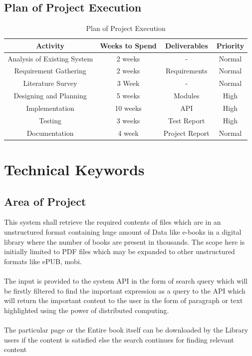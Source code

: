 \documentclass[oneside,a4paper,12pt]{report}
\begin{document}
\section{Plan of Project Execution}
\begin{table}[!htbp]
\begin{center}
\def\arraystretch{1.5}
  \begin{tabular}{| c | c | c | c |}
       \hline

	\textbf{Activity} & \textbf{Weeks to Spend} & \textbf{Deliverables} & \textbf{Priority}\\ \hline
	Analysis of Existing System & 2 weeks & - & Normal \\ \hline
	Requirement Gathering & 2 weeks & Requirements & Normal \\ \hline 
	Literature Survey & 3 Week & - & Normal \\ \hline
	Designing and Planning & 5 weeks & Modules & High \\ \hline
	Implementation & 10 weeks & API & High \\ \hline
	Testing & 3 weeks & Test Report & High \\ \hline
	Documentation & 4 week & Project Report & Normal \\ \hline
\end{tabular}
 \caption { Plan of Project Execution }
 \label{tab:hreq}
\end{center}

\end{table}



\chapter{Technical Keywords}
\section{Area of Project}
This  system  shall  retrieve  the  required  contents  of  files  which  are  in  an  unstructured  format containing huge amount of Data like e-books in a digital library where the number of books are present in thousands. The scope here is initially limited to PDF files which may be expanded to other unstructured formats like ePUB, mobi. \\ \\
The input is provided to the system API in the form of search query which will be firstly filtered to find the important expression as a query to the API which will return the important content to the user in the form of paragraph or text highlighted using the power of distributed computing. \\ \\
The particular page or the Entire book itself can be downloaded by the Library users if the content is satisfied else the search continues for finding relevant content
\end{document}
